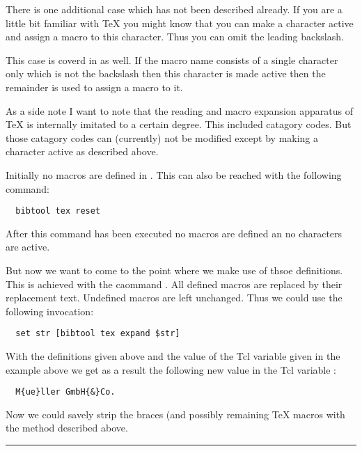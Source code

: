 There is one additional case which has not been described already. If
you are a little bit familiar with \TeX{} you might know that you can
make a character active and assign a macro to this character. Thus you
can omit the leading backslash.

This case is coverd in  as well. If the macro
name consists of a single character only which is not the backslash
then this character is made active then the remainder is used to
assign a macro to it.

As a side note I want to note that the reading and macro expansion
apparatus of \TeX{} is internally imitated to a certain degree.  This
included catagory codes. But those catagory codes can (currently) not
be modified except by making a character active as described above.

Initially no macros are defined in \BibTool. This can also be reached
with the following command:
\begin{verbatim}
  bibtool tex reset
\end{verbatim}
After this command has been executed no macros are defined an no
characters are active.

But now we want to come to the point where we make use of thsoe
definitions. This is achieved with the caommand . All defined macros are replaced by their replacement
text. Undefined macros are left unchanged. Thus we could use the
following invocation:
\begin{verbatim}
  set str [bibtool tex expand $str]
\end{verbatim}%
With the definitions given above and the value of the Tcl variable
 given in the example above we get as a result the following
new value in the Tcl variable :
\begin{verbatim}
  M{ue}ller GmbH{&}Co.
\end{verbatim}
Now we could savely strip the braces (and possibly remaining \TeX{}
macros with the method described above.

\begin{table}[tp]



  \caption{Summary of operations on \TeX{} strings}\label{fig:tcl-tex}
  \rule{\textwidth}{.1pt}
\end{table}


